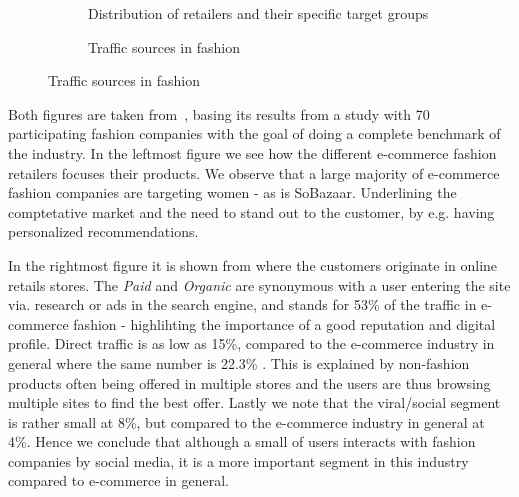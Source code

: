 \begin{figure}[H]
  \centering
  \begin{subfigure}[b]{0.5\textwidth}
    \caption{Distribution of retailers and their specific target groups}
  \end{subfigure}
  \begin{subfigure}[b]{0.5\textwidth}
    \caption{Traffic sources in fashion}
  \end{subfigure}
\end{figure}

Both figures are taken from~\cite{Jorij2012}, basing its results from a study
with 70 participating fashion companies with the goal of doing a complete
benchmark of the industry. In the leftmost figure we see how the different
e-commerce fashion retailers focuses their products. We observe that a large
majority of e-commerce fashion companies are targeting women - as is
SoBazaar.  Underlining the comptetative market and the need to stand out to
the customer, by e.g. having personalized recommendations.

In the rightmost figure it is shown from where the customers originate in
online retails stores. The \textit{Paid} and \textit{Organic} are synonymous
with a user entering the site via. research or ads in the search engine, and
stands for 53\% of the traffic in e-commerce fashion - highlihting the
importance of a good reputation and digital profile. Direct traffic is as low
as 15\%, compared to the e-commerce industry in general where the same number
is 22.3\% \cite{Jorij2012}. This is explained by non-fashion products often
being offered in multiple stores and the users are thus browsing multiple
sites to find the best offer. Lastly we note that the viral/social segment is
rather small at 8\%, but compared to the e-commerce industry in general at
4\%. Hence we conclude that although a small of users interacts with fashion
companies by social media, it is a more important segment in this industry
compared to e-commerce in general.

